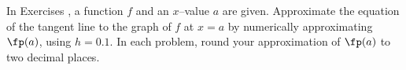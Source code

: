 {\noindent In Exercises}
{, a function $f$ and an $x$--value $a$ are given. Approximate the equation of the tangent line to the graph of $f$ at $x=a$ by numerically approximating $\fp(a)$, using $h=0.1$.  In each problem, round your approximation of $\fp(a)$ to two decimal places.
}

